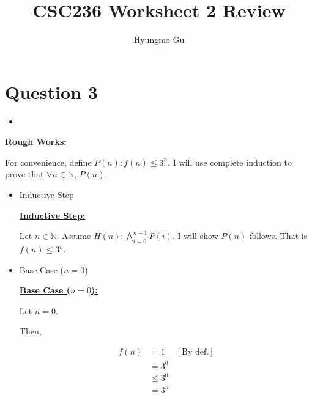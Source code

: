 \documentclass[12pt]{article}
\begin{document}
\title{CSC236 Worksheet 2 Review}
\author{Hyungmo Gu}
\maketitle

\section*{Question 3}

\begin{itemize}
    \item
\end{itemize}

\bigskip

\begin{mdframed}
    \underline{\textbf{Rough Works:}}

    \bigskip

    For convenience, define $P(n): f(n) \leq 3^n$. I will use complete induction to
    prove that $\forall n \in \mathbb{N}$, $P(n)$.

    \bigskip

    \begin{itemize}
        \item Inductive Step

        \begin{mdframed}
        \underline{\textbf{Inductive Step:}}

        \bigskip

        Let $n \in \mathbb{N}$. Assume $H(n): \bigwedge_{i=0}^{n-1} P(i)$. I will
        show $P(n)$ follows. That is $f(n) \leq 3^n$.
        \end{mdframed}

        \item Base Case ($n = 0$)

        \begin{mdframed}
        \underline{\textbf{Base Case ($n = 0$):}}

        \bigskip

        Let $n = 0$.

        \bigskip

        Then,

        \begin{align}
            f(n) &= 1 & [\text{By def.}]\\
            &= 3^0\\
            &\leq 3^0\\
            &= 3^n
        \end{align}


\end{mdframed}
\end{itemize}
\end{mdframed}
\end{document}
